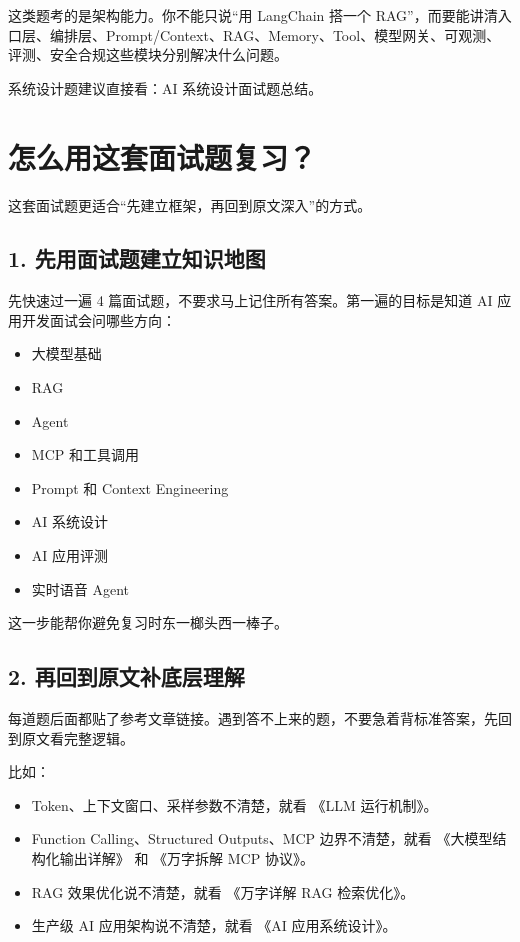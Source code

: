 \documentclass[9pt,a4paper,twocolumn]{ctexart}
\begin{document}
这类题考的是架构能力。你不能只说“用 LangChain 搭一个 RAG”，而要能讲清入口层、编排层、Prompt/Context、RAG、Memory、Tool、模型网关、可观测、评测、安全合规这些模块分别解决什么问题。



系统设计题建议直接看：AI 系统设计面试题总结。



\section*{怎么用这套面试题复习？}


这套面试题更适合“先建立框架，再回到原文深入”的方式。



\subsection*{1. 先用面试题建立知识地图}


先快速过一遍 4 篇面试题，不要求马上记住所有答案。第一遍的目标是知道 AI 应用开发面试会问哪些方向：


\begin{itemize}[itemsep=1pt, topsep=2pt]
  \item 大模型基础
  \item RAG
  \item Agent
  \item MCP 和工具调用
  \item Prompt 和 Context Engineering
  \item AI 系统设计
  \item AI 应用评测
  \item 实时语音 Agent
\end{itemize}


这一步能帮你避免复习时东一榔头西一棒子。



\subsection*{2. 再回到原文补底层理解}


每道题后面都贴了参考文章链接。遇到答不上来的题，不要急着背标准答案，先回到原文看完整逻辑。



比如：


\begin{itemize}[itemsep=1pt, topsep=2pt]
  \item Token、上下文窗口、采样参数不清楚，就看 《LLM 运行机制》。
  \item Function Calling、Structured Outputs、MCP 边界不清楚，就看 《大模型结构化输出详解》 和 《万字拆解 MCP 协议》。
  \item RAG 效果优化说不清楚，就看 《万字详解 RAG 检索优化》。
  \item 生产级 AI 应用架构说不清楚，就看 《AI 应用系统设计》。
\end{itemize}
\end{document}
